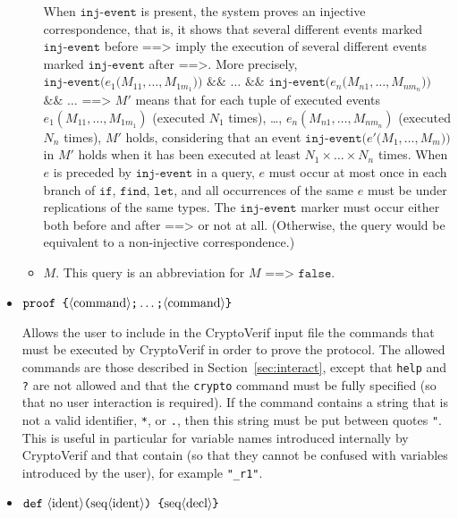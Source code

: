 \begin{itemize}
\begin{itemize}
When $\texttt{inj-event}$ is present, the system proves an injective
correspondence, that is, it shows that several different events marked
$\texttt{inj-event}$ before $\texttt{==>}$ imply the execution of several
different events marked $\texttt{inj-event}$ after $\texttt{==>}$.
%
More precisely, $\texttt{inj-event(}e_1\texttt{(}M_{11}, \ldots, M_{1m_1}\texttt{))}$
$\texttt{\&\&}$ $\ldots$ $\texttt{\&\&}$ $\texttt{inj-event(}e_n\texttt{(}M_{n1}, \ldots, \allowbreak
M_{nm_n} \texttt{))}$ $\texttt{\&\&}$ $\ldots$ $\texttt{==>}$ $M'$ means that for each
tuple of executed events $e_1(M_{11}, \allowbreak \ldots, M_{1m_1})$
(executed $N_1$ times), \ldots, $e_n(M_{n1}, \ldots, M_{nm_n})$
(executed $N_n$ times), $M'$ holds, considering that an event
$\texttt{inj-event(}e'\texttt{(}M_1, \ldots, M_m\texttt{))}$ in $M'$ holds when it has been
executed at least $N_1 \times \ldots \times N_n$ times.
%
When $e$ is preceded by $\texttt{inj-event}$ in a query, $e$ must occur at
most once in each branch of $\texttt{if}$, $\texttt{find}$,
$\texttt{let}$, and all occurrences of the same $e$ must be under
replications of the same types.
%
The $\texttt{inj-event}$ marker must
occur either both before and after $\texttt{==>}$ or not at all. (Otherwise,
the query would be equivalent to a non-injective correspondence.)

\item $M$. This query is an abbreviation for $M \texttt{ ==> false}$.

\end{itemize}

\item $\texttt{proof \{}\langle\textrm{command}\rangle\texttt{;}\ldots \texttt{;}\langle\textrm{command}\rangle \texttt{\}}$

Allows the user to include in the CryptoVerif input file the commands
that must be executed by CryptoVerif in order to prove the protocol.
The allowed commands are those described in Section~\ref{sec:interact},
except that \texttt{help} and \texttt{?} are not allowed and that
the \texttt{crypto} command must be fully specified (so that no user 
interaction is required). If the command contains a string that
is not a valid identifier, \texttt{*}, or \texttt{.}, then this string
must be put between quotes \texttt{"}. This is useful in particular for
variable names introduced internally by CryptoVerif and that contain
\texttt{\string@} (so that they cannot be confused with variables introduced
by the user), for example \texttt{"\_r1"}.

\item ${\tt def\ }\nonterm{ident}\texttt{(}\seq{ident}\texttt{) \{}
\seq{decl}\texttt{\}}$ 


\end{itemize}
